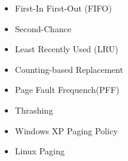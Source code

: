 \documentclass[12pt]{article}
\begin{document}
\begin{itemize}
    \item First-In First-Out (FIFO)
    \item Second-Chance
    \item Least Recently Used (LRU)
    \item Counting-based Replacement
    \item Page Fault Frequench(PFF)
    \item Thrashing
    \item Windows XP Paging Policy
    \item Linux Paging
\end{itemize}
\end{document}
